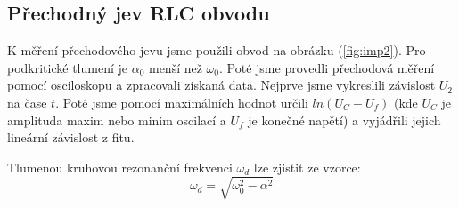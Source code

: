 \documentclass[a4paper,11pt]{article}
\begin{document}
\begin{minipage}[t]{0.5\textwidth}
        \subsection{Přechodný jev RLC obvodu}
            K měření přechodového jevu jsme použili obvod na obrázku (\ref{fig:imp2}). Pro podkritické tlumení je $\alpha_0$ menší než $\omega_0$. Poté jsme provedli přechodová měření pomocí osciloskopu a zpracovali získaná data. Nejprve jsme vykreslili závislost $U_2$ na čase $t$. Poté jsme pomocí maximálních hodnot určili $ln(U_C-U_f)$ (kde $U_C$ je amplituda maxim nebo minim oscilací a $U_f$ je konečné napětí) a vyjádřili jejich lineární závislost z fitu.
            \par Tlumenou kruhovou rezonanční frekvenci  $\omega_d$ lze zjistit ze vzorce:
            \begin{equation}
                \omega_d = \sqrt{\omega_0^2-\alpha^2}
            \end{equation}
\end{minipage}
\newpage
\end{document}
